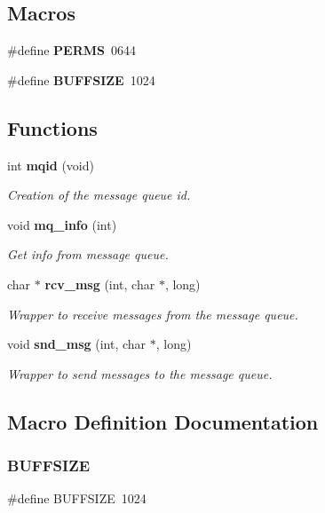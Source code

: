\subsection*{Macros}
\begin{DoxyCompactItemize}
\item 
\#define \textbf{ P\+E\+R\+MS}~0644
\item 
\#define \textbf{ B\+U\+F\+F\+S\+I\+ZE}~1024
\end{DoxyCompactItemize}
\subsection*{Functions}
\begin{DoxyCompactItemize}
\item 
int \textbf{ mqid} (void)
\begin{DoxyCompactList}\small\item\em Creation of the message queue id. \end{DoxyCompactList}\item 
void \textbf{ mq\+\_\+info} (int)
\begin{DoxyCompactList}\small\item\em Get info from message queue. \end{DoxyCompactList}\item 
char $\ast$ \textbf{ rcv\+\_\+msg} (int, char $\ast$, long)
\begin{DoxyCompactList}\small\item\em Wrapper to receive messages from the message queue. \end{DoxyCompactList}\item 
void \textbf{ snd\+\_\+msg} (int, char $\ast$, long)
\begin{DoxyCompactList}\small\item\em Wrapper to send messages to the message queue. \end{DoxyCompactList}\end{DoxyCompactItemize}


\subsection{Macro Definition Documentation}
\mbox{\label{mq_8h_a39912bfe2a55f30e269196f9141d845d}} 
\subsubsection{B\+U\+F\+F\+S\+I\+ZE}
{\footnotesize\ttfamily \#define B\+U\+F\+F\+S\+I\+ZE~1024}

